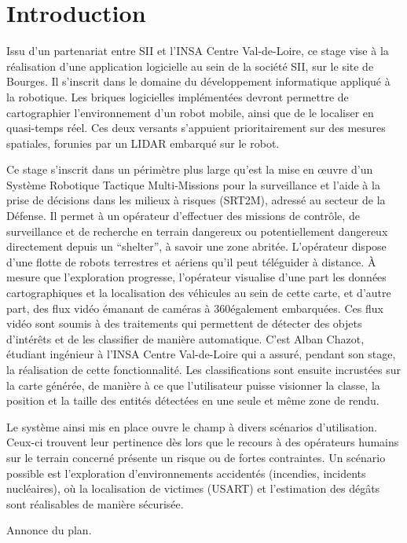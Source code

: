 \chapter*{Introduction}

Issu d’un partenariat entre \gls{SII} et l’INSA Centre Val-de-Loire, ce stage vise à la réalisation d’une application logicielle au sein de la société SII, sur le site de Bourges. 
Il s’inscrit dans le domaine du développement informatique appliqué à la robotique. 
Les briques logicielles implémentées devront permettre de cartographier l’environnement d’un robot mobile, ainsi que de le localiser en quasi-temps réel. 
Ces deux versants s’appuient prioritairement sur des mesures spatiales, forunies par un \gls{LIDAR} embarqué sur le robot. 

Ce stage s'inscrit dans un périmètre plus large qu’est la mise en \oe{}uvre d’un Système Robotique Tactique Multi-Missions pour la surveillance et l’aide à la prise de décisions dans les milieux à risques (\gls{SRT2M}), 
adressé au secteur de la Défense. 
Il permet à un opérateur d’effectuer des missions de contrôle, de surveillance et de recherche en terrain dangereux ou potentiellement dangereux directement depuis un ``shelter'', à savoir une zone abritée. 
L’opérateur dispose d’une flotte de robots terrestres et aériens qu’il peut téléguider à distance. 
\`{A} mesure que l’exploration progresse, l’opérateur visualise d’une part les données cartographiques et la localisation des véhicules au sein de cette carte, et d’autre part, 
des flux vidéo émanant de caméras à 360\degre également embarquées. 
Ces flux vidéo sont soumis à des traitements qui permettent de détecter des objets d’intérêts et de les classifier de manière automatique. 
C'est Alban Chazot, étudiant ingénieur à l'INSA Centre Val-de-Loire qui a assuré, pendant son stage, la réalisation de cette fonctionnalité.   
Les classifications sont ensuite incrustées sur la carte générée, de manière à ce que l'utilisateur puisse visionner la classe, la position et la taille des entités détectées en une seule et même zone de rendu. 

Le système ainsi mis en place ouvre le champ à divers scénarios d’utilisation. 
Ceux-ci trouvent leur pertinence dès lors que le recours à des opérateurs humains sur le terrain concerné présente un risque ou de fortes contraintes. 
Un scénario possible est l’exploration d’environnements accidentés (incendies, incidents nucléaires), où la localisation de victimes (USART) et l’estimation des dégâts sont réalisables de manière sécurisée. 

Annonce du plan. 